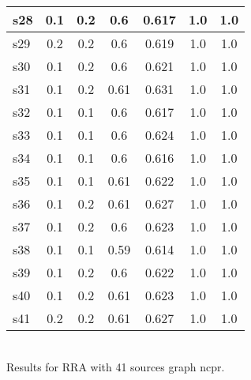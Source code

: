 \documentclass{article}
\begin{document}
\begin{tabular}{|l|c|c|c|c|c|c|}
\hline
s28 &0.1 & 0.2 & 0.6 & 0.617 & 1.0 & 1.0\\
\hline
s29 &0.2 & 0.2 & 0.6 & 0.619 & 1.0 & 1.0\\
\hline
s30 &0.1 & 0.2 & 0.6 & 0.621 & 1.0 & 1.0\\
\hline
s31 &0.1 & 0.2 & 0.61 & 0.631 & 1.0 & 1.0\\
\hline
s32 &0.1 & 0.1 & 0.6 & 0.617 & 1.0 & 1.0\\
\hline
s33 &0.1 & 0.1 & 0.6 & 0.624 & 1.0 & 1.0\\
\hline
s34 &0.1 & 0.1 & 0.6 & 0.616 & 1.0 & 1.0\\
\hline
s35 &0.1 & 0.1 & 0.61 & 0.622 & 1.0 & 1.0\\
\hline
s36 &0.1 & 0.2 & 0.61 & 0.627 & 1.0 & 1.0\\
\hline
s37 &0.1 & 0.2 & 0.6 & 0.623 & 1.0 & 1.0\\
\hline
s38 &0.1 & 0.1 & 0.59 & 0.614 & 1.0 & 1.0\\
\hline
s39 &0.1 & 0.2 & 0.6 & 0.622 & 1.0 & 1.0\\
\hline
s40 &0.1 & 0.2 & 0.61 & 0.623 & 1.0 & 1.0\\
\hline
s41 &0.2 & 0.2 & 0.61 & 0.627 & 1.0 & 1.0\\
\hline
\end{tabular}\\

\noindent Results for RRA with 41 sources graph ncpr.
\end{document}
